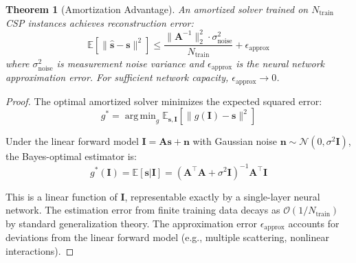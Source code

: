 \documentclass[11pt,twocolumn,a4paper]{article}
\newtheorem{theorem}{Theorem}[section]
\theoremstyle{definition}
\theoremstyle{remark}
\DeclareMathOperator*{\argmin}{arg\,min}
\begin{document}
\begin{theorem}[Amortization Advantage]
\label{thm:amortization}
An amortized solver trained on $N_{\text{train}}$ CSP instances achieves reconstruction error:
\begin{equation}
\mathbb{E}[\|\hat{\mathbf{s}} - \mathbf{s}\|^2] \leq \frac{\|\mathbf{A}^{-1}\|_2^2 \cdot \sigma_{\text{noise}}^2}{N_{\text{train}}} + \epsilon_{\text{approx}}
\end{equation}
where $\sigma_{\text{noise}}^2$ is measurement noise variance and $\epsilon_{\text{approx}}$ is the neural network approximation error. For sufficient network capacity, $\epsilon_{\text{approx}} \to 0$.
\end{theorem}

\begin{proof}
The optimal amortized solver minimizes the expected squared error:
\begin{equation}
g^* = \argmin_g \mathbb{E}_{\mathbf{s}, \mathbf{I}}[\|g(\mathbf{I}) - \mathbf{s}\|^2]
\end{equation}

Under the linear forward model $\mathbf{I} = \mathbf{A}\mathbf{s} + \mathbf{n}$ with Gaussian noise $\mathbf{n} \sim \mathcal{N}(0, \sigma^2 \mathbf{I})$, the Bayes-optimal estimator is:
\begin{equation}
g^*(\mathbf{I}) = \mathbb{E}[\mathbf{s} | \mathbf{I}] = (\mathbf{A}^\top \mathbf{A} + \sigma^2 \mathbf{I})^{-1} \mathbf{A}^\top \mathbf{I}
\end{equation}

This is a linear function of $\mathbf{I}$, representable exactly by a single-layer neural network. The estimation error from finite training data decays as $\mathcal{O}(1/N_{\text{train}})$ by standard generalization theory. The approximation error $\epsilon_{\text{approx}}$ accounts for deviations from the linear forward model (e.g., multiple scattering, nonlinear interactions).
\end{proof}
\end{document}
